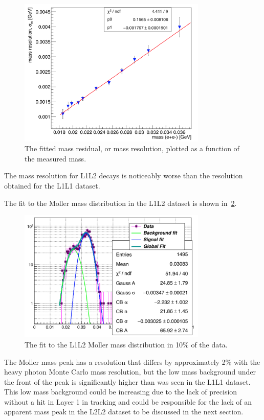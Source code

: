 \documentclass[twoside]{article}
\begin{document}
\begin{figure}[H]
  \centering
      \includegraphics[width=0.8\textwidth]{plots/massRes_L1L2.png}
  \caption{The fitted mass residual, or mass resolution, plotted as a function of the measured mass.}
  \label{fig:massRes_l1l2}
\end{figure} 

The mass resolution for L1L2 decays is noticeably worse than the resolution obtained for the L1L1 dataset.

The fit to the Moller mass distribution in the L1L2 dataset is shown in~\ref{fig:mollerL1L2}.

\begin{figure}[H]
  \centering
      \includegraphics[width=0.8\textwidth]{plots/MollerMassL1L2_data.png}
  \caption{The fit to the L1L2 Moller mass distribution in 10$\%$ of the data.}
  \label{fig:mollerL1L2}
\end{figure} 

The Moller mass peak has a resolution that differs by approximately 2$\%$ with the heavy photon Monte Carlo mass resolution, but the low mass background under the front of the peak is significantly higher than was seen in the L1L1 dataset. This low mass background could be increasing due to the lack of precision without a hit in Layer 1 in tracking and could be responsible for the lack of an apparent mass peak in the L2L2 dataset to be discussed in the next section.
\end{document}
